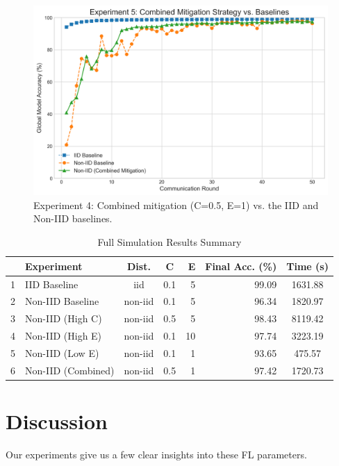 \documentclass[conference]{IEEEtran}
\begin{document}
\begin{figure}[htbp]
  \centering
  \includegraphics[width=0.9\linewidth]{fig_5_combined_mitigation.png}
  \caption{Experiment 4: Combined mitigation (C=0.5, E=1) vs. the IID and Non-IID baselines.}
  \label{fig:combined}
\end{figure}


\begin{table}[htbp]
\caption{Full Simulation Results Summary}
\begin{center}
\begin{tabular}{@{}llccrrc@{}}
\toprule
 & \textbf{Experiment} & \textbf{Dist.} & \textbf{C} & \textbf{E} & \textbf{Final Acc. (\%)} & \textbf{Time (s)} \\
\midrule
1 & IID Baseline & iid & 0.1 & 5 & 99.09 & 1631.88 \\
2 & Non-IID Baseline & non-iid & 0.1 & 5 & 96.34 & 1820.97 \\
3 & Non-IID (High C) & non-iid & 0.5 & 5 & 98.43 & 8119.42 \\
4 & Non-IID (High E) & non-iid & 0.1 & 10 & 97.74 & 3223.19 \\
5 & Non-IID (Low E) & non-iid & 0.1 & 1 & 93.65 & 475.57 \\
6 & Non-IID (Combined) & non-iid & 0.5 & 1 & 97.42 & 1720.73 \\
\bottomrule
\end{tabular}
\label{tab:results}
\end{center}
\end{table}


\section{Discussion}
Our experiments give us a few clear insights into these FL parameters.
\end{document}

